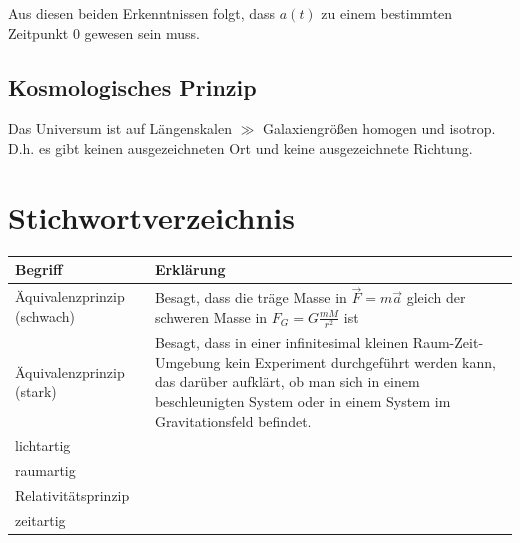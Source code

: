 \documentclass{article}
\begin{document}
Aus diesen beiden Erkenntnissen folgt, dass $a(t)$ zu einem bestimmten Zeitpunkt 0 gewesen sein muss.


\subsection{Kosmologisches Prinzip}
Das Universum ist auf Längenskalen $\gg$ Galaxiengrößen homogen und isotrop.\\
D.h. es gibt keinen ausgezeichneten Ort und keine ausgezeichnete Richtung.








\newpage


\section{Stichwortverzeichnis}
\begin{xltabular}{\linewidth}{p{6cm}|X}
	\hline\hline
		Begriff & Erklärung \\
	\hline
		Äquivalenzprinzip (schwach) & Besagt, dass die träge Masse in $\vec{F} = m\vec{a}$ gleich der schweren Masse in $F_G = G \frac{mM}{r^2}$ ist \\
	\hline
		Äquivalenzprinzip (stark) & Besagt, dass in einer infinitesimal kleinen Raum-Zeit-Umgebung kein Experiment durchgeführt werden kann, das darüber aufklärt, ob man sich in einem beschleunigten System oder in einem System im Gravitationsfeld befindet.\\
	\hline
		lichtartig &  \\
	\hline
		raumartig &  \\
	\hline
		Relativitätsprinzip &  \\
	\hline
		zeitartig &  \\
	\hline\hline
\end{xltabular}
\end{document}
